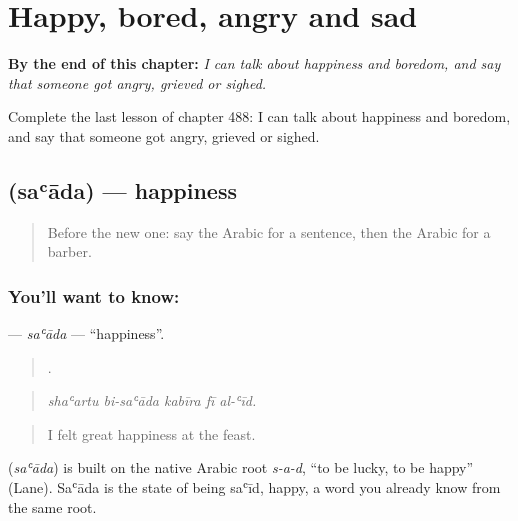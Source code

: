 
\chapter{Happy, bored, angry and sad}
\label{ch:ar-happy-bored-angry-and-sad}

\begin{chapteropening}
\textbf{By the end of this chapter:} \emph{I can talk about happiness and boredom, and say that someone got angry, grieved or sighed.}

Complete the last lesson of chapter 488: I can talk about happiness and boredom, and say that someone got angry, grieved or sighed.
\end{chapteropening}

\section[\texorpdfstring{\ar{سعادة} (saʿāda)}{سعادة (saʿāda)}]{ (saʿāda) — happiness}

\label{lesson:AR-C488-saada}



\begin{quote}
Before the new one: say the Arabic for a sentence, then the Arabic for a barber.
\end{quote}

\subsection*{You'll want to know: }
\textbf{} — \emph{saʿāda} — \textquotedblleft{}happiness\textquotedblright{}.

\begin{quote}
    .
\end{quote}

\begin{quote}
\emph{shaʿartu bi-saʿāda kabīra fī al-ʿīd.}
\end{quote}

\begin{quote}
I felt great happiness at the feast.
\end{quote}

\begin{cousinweb}
\textbf{} (\emph{saʿāda}) is built on the native Arabic root \emph{s-a-d}, \textquotedblleft{}to be lucky, to be happy\textquotedblright{} (Lane). Saʿāda is the state of being saʿīd, happy, a word you already know from the same root.
\end{cousinweb}

